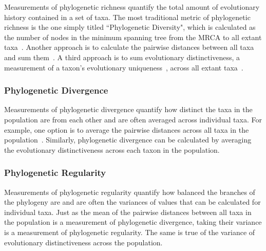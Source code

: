 \documentclass[letterpaper]{article}
\begin{document}
Measurements of phylogenetic richness quantify the total amount of evolutionary history contained in a set of taxa. The most traditional metric of phylogenetic richness is the one simply titled ``Phylogenetic Diversity", which is calculated as the number of nodes in the minimum spanning tree from the MRCA to all extant taxa~\citep{faith_conservation_1992}. Another approach is to calculate the pairwise distances between all taxa and sum them~\citep{tucker_guide_2017}. A third approach is to sum evolutionary distinctiveness, a measurement of a taxon's evolutionary uniqueness~\citep{isaac_mammals_2007}, across all extant taxa~\citep{tucker_guide_2017}.

\subsubsection{Phylogenetic Divergence}

Measurements of phylogenetic divergence quantify how distinct the taxa in the population are from each other and are often %
averaged across
individual taxa. For example, one option is to 
average the pairwise distances across
all taxa in the population~\citep{webb_exploring_2000}. Similarly, phylogenetic divergence can be calculated by 
averaging the evolutionary distinctiveness across each taxon in the population.

\subsubsection{Phylogenetic Regularity}

Measurements of phylogenetic regularity quantify how balanced the branches of the phylogeny are and are often the variances of values that can be calculated for individual taxa. Just as the mean of the pairwise distances between all taxa in the population is a measurement of phylogenetic divergence, taking their variance is a measurement of phylogenetic regularity. The same is true of the variance of evolutionary distinctiveness across the population.
\end{document}
